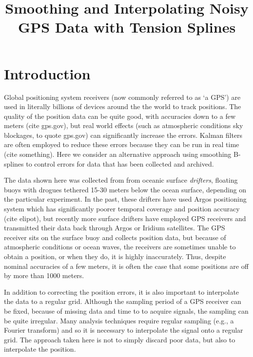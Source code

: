 \documentclass[twocol]{ametsoc}
\title{Smoothing and Interpolating Noisy GPS Data with Tension Splines}
\affiliation{NorthWest Research Associates}
\begin{document}
\maketitle

\section{Introduction}
Global positioning system receivers (now commonly referred to as `a GPS') are used in literally billions of devices around the the world to track positions. The quality of the position data can be quite good, with accuracies down to a few meters (cite gps.gov), but real world effects (such as atmospheric conditions sky blockages, to quote gps.gov) can significantly increase the errors. Kalman filters are often employed to reduce these errors because they can be run in real time (cite something). Here we consider an alternative approach using smoothing B-splines to control errors for data that has been collected and archived.

The data shown here was collected from from oceanic surface \emph{drifters}, floating buoys with drogues tethered 15-30 meters below the ocean surface, depending on the particular experiment. In the past, these drifters have used Argos positioning system which has significantly poorer temporal coverage and position accuracy (cite elipot), but recently more surface drifters have employed GPS receivers and transmitted their data back through Argos or Iridium satellites. The GPS receiver sits on the surface buoy and collects position data, but because of atmospheric conditions or ocean waves, the receivers are sometimes unable to obtain a position, or when they do, it is highly inaccurately. Thus, despite nominal accuracies of a few meters, it is often the case that some positions are off by more than 1000 meters.

In addition to correcting the position errors, it is also important to interpolate the data to a regular grid. Although the sampling period of a GPS receiver can be fixed, because of missing data and time to to acquire signals, the sampling can be quite irregular.  Many analysis techniques require regular sampling (e.g., a Fourier transform) and so it is necessary to interpolate the signal onto a regular grid. The approach taken here is not to simply discard poor data, but also to interpolate the position.
\end{document}
